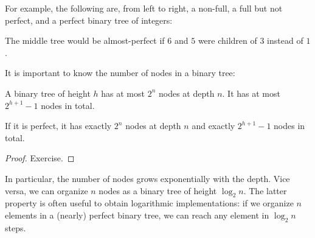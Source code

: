 For example, the following are, from left to right, a non-full, a full but not perfect, and a perfect binary tree of integers:
\begin{center}
\tb\tb
{}
\tb\tb
{}
\end{center}
The middle tree would be almost-perfect if $6$ and $5$ were children of $3$ instead of $1$.

It is important to know the number of nodes in a binary tree:

\begin{theorem}\label{thm:ad:bintree}
A binary tree of height $h$ has at most $2^n$ nodes at depth $n$.
It has at most $2^{h+1}-1$ nodes in total.

If it is perfect, it has exactly $2^n$ nodes at depth $n$ and exactly $2^{h+1}-1$ nodes in total.
\end{theorem}
\begin{proof}
Exercise.
\end{proof}

In particular, the number of nodes grows exponentially with the depth.
Vice versa, we can organize $n$ nodes as a binary tree of height $\log_2 n$.
The latter property is often useful to obtain logarithmic implementations: if we organize $n$ elements in a (nearly) perfect binary tree, we can reach any element in $\log_2 n$ steps.

